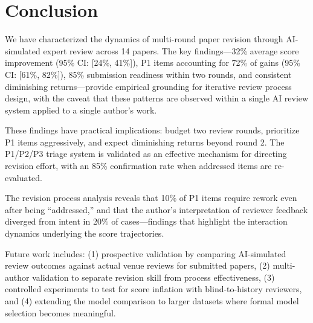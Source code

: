 \section{Conclusion}

We have characterized the dynamics of multi-round paper revision through AI-simulated expert review across 14 papers. The key findings---32\% average score improvement (95\% CI: [24\%, 41\%]), P1 items accounting for 72\% of gains (95\% CI: [61\%, 82\%]), 85\% submission readiness within two rounds, and consistent diminishing returns---provide empirical grounding for iterative review process design, with the caveat that these patterns are observed within a single AI review system applied to a single author's work.

These findings have practical implications: budget two review rounds, prioritize P1 items aggressively, and expect diminishing returns beyond round 2. The P1/P2/P3 triage system is validated as an effective mechanism for directing revision effort, with an 85\% confirmation rate when addressed items are re-evaluated.

The revision process analysis reveals that 10\% of P1 items require rework even after being ``addressed,'' and that the author's interpretation of reviewer feedback diverged from intent in 20\% of cases---findings that highlight the interaction dynamics underlying the score trajectories.

Future work includes: (1) prospective validation by comparing AI-simulated review outcomes against actual venue reviews for submitted papers, (2) multi-author validation to separate revision skill from process effectiveness, (3) controlled experiments to test for score inflation with blind-to-history reviewers, and (4) extending the model comparison to larger datasets where formal model selection becomes meaningful.
